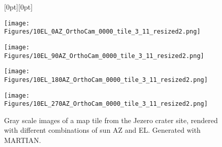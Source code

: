 \begin{figure}
    \vspace{0.1cm} %

    \begin{minipage}[b]{0.022\linewidth}
        \raisebox{2em}[0pt][0pt]{} %
    \end{minipage}
    \begin{minipage}[b]{0.19\linewidth}
        \centering
        \texttt{[image: Figures/10EL\_0AZ\_OrthoCam\_0000\_tile\_3\_11\_resized2.png]}
    \end{minipage}
    \begin{minipage}[b]{0.19\linewidth}
        \centering
        \texttt{[image: Figures/10EL\_90AZ\_OrthoCam\_0000\_tile\_3\_11\_resized2.png]}
    \end{minipage}
    \begin{minipage}[b]{0.19\linewidth}
        \centering
        \texttt{[image: Figures/10EL\_180AZ\_OrthoCam\_0000\_tile\_3\_11\_resized2.png]}
    \end{minipage}
    \begin{minipage}[b]{0.19\linewidth}
        \centering
        \texttt{[image: Figures/10EL\_270AZ\_OrthoCam\_0000\_tile\_3\_11\_resized2.png]}
    \end{minipage}
    \caption{\label{fig:map_tile_w_lighting_var} Gray scale images of a map tile from the Jezero crater site, rendered with different combinations of sun AZ and EL. Generated with MARTIAN.}
\end{figure}
